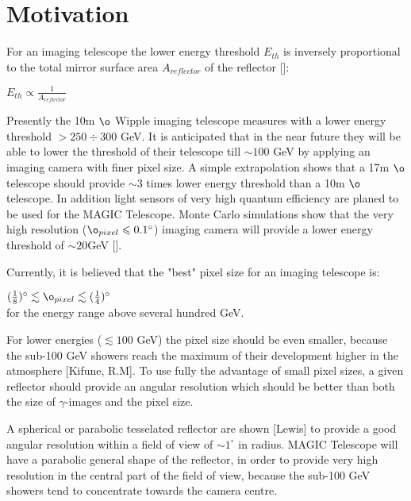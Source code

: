 \section{Motivation}

For an imaging telescope the lower energy threshold $E_{th}$ is
inversely proportional to the total mirror surface area
$A_{reflector}$ of the reflector []:

\vspace{0.2cm}

\centerline {$E_{th} \varpropto \frac{1}{A_{reflector}}$}

\vspace{0.2cm}

Presently the 10m $\o $ Wipple imaging telescope measures with a lower
energy threshold $ > 250 \div 300 $ GeV. It is anticipated that in the
near future they will be able to lower the threshold of their
telescope till $ \sim 100 $ GeV by applying an imaging camera with
finer pixel size. A simple extrapolation shows that a 17m $\o $
telescope should provide $ \sim 3$ times lower energy threshold than a
10m $\o$ telescope. In addition light sensors of very high quantum
efficiency are planed to be used for the MAGIC Telescope. Monte Carlo
simulations show that the very high resolution ($\o_{pixel} \leqslant
0.1^{\circ} $) imaging camera will provide a lower energy threshold of
$\sim 20 $GeV [].

\vspace{1cm}

Currently, it is believed that the "best" pixel size for an imaging
telescope is:

$(\frac{1}{8})^{\circ} \lesssim \o_{pixel} \lesssim
(\frac{1}{4})^{\circ}$ \\ for the energy range above several hundred
GeV.

For lower energies ($ \lesssim 100 $ GeV) the pixel size should be
even smaller, because the sub-100 GeV showers reach the maximum of
their development higher in the atmosphere [Kifune, R.M]. To use fully
the advantage of small pixel sizes, a given reflector should provide
an angular resolution which should be better than both the size of
$\gamma$-images and the pixel size.

A spherical or parabolic tesselated reflector are shown [Lewis] to
provide a good angular resolution within a field of view of $ \sim
1^{\circ} $ in radius. MAGIC Telescope will have a parabolic general
shape of the reflector, in order to provide very high resolution in
the central part of the field of view, because the sub-100 GeV showers
tend to concentrate towards the camera centre.

